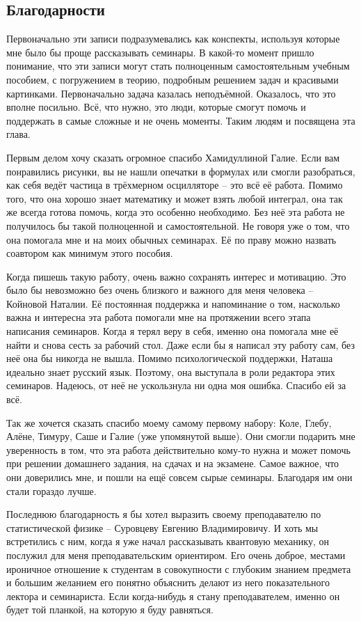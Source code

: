 \begin{center}
    \section{Благодарности}
\end{center}

Первоначально эти записи подразумевались как конспекты, используя которые мне было бы проще рассказывать семинары. В какой-то момент пришло понимание, что эти записи могут стать полноценным самостоятельным учебным пособием, с погружением в теорию, подробным решением задач и красивыми картинками. Первоначально задача казалась неподъёмной. Оказалось, что это вполне посильно. Всё, что нужно, это люди, которые смогут помочь и поддержать в самые сложные и не очень моменты. Таким людям и посвящена эта глава.

Первым делом хочу сказать огромное спасибо Хамидуллиной Галие. Если вам понравились рисунки, вы не нашли опечатки в формулах или смогли разобраться, как себя ведёт частица в трёхмерном осцилляторе -- это всё её работа. Помимо того, что она хорошо знает математику и может взять любой интеграл, она так же всегда готова помочь, когда это особенно необходимо. Без неё эта работа не получилось бы такой полноценной и самостоятельной. Не говоря уже о том, что она помогала мне и на моих обычных семинарах. Её по праву можно назвать соавтором как минимум этого пособия.

Когда пишешь такую работу, очень важно сохранять интерес и мотивацию. Это было бы невозможно без очень близкого и важного для меня человека -- Койновой Наталии. Её постоянная поддержка и напоминание о том, насколько важна и интересна эта работа помогали мне на протяжении всего этапа написания семинаров. Когда я терял веру в себя, именно она помогала мне её найти и снова сесть за рабочий стол. Даже если бы я написал эту работу сам, без неё она бы никогда не вышла. Помимо психологической поддержки, Наташа идеально знает русский язык. Поэтому, она выступала в роли редактора этих семинаров. Надеюсь, от неё не ускользнула ни одна моя ошибка. Спасибо ей за всё.

Так же хочется сказать спасибо моему самому первому набору: Коле, Глебу, Алёне, Тимуру, Саше и Галие (уже упомянутой выше). Они смогли подарить мне уверенность в том, что эта работа действительно кому-то нужна и может помочь при решении домашнего задания, на сдачах и на экзамене. Самое важное, что они доверились мне, и пошли на ещё совсем сырые семинары. Благодаря им они стали гораздо лучше.

Последнюю благодарность я бы хотел выразить своему преподавателю по статистической физике -- Суровцеву Евгению Владимировичу. И хоть мы встретились с ним, когда я уже начал рассказывать квантовую механику, он послужил для меня преподавательским ориентиром. Его очень доброе, местами ироничное отношение к студентам в совокупности с глубоким знанием предмета и большим желанием его понятно объяснить делают из него показательного лектора и семинариста. Если когда-нибудь я стану преподавателем, именно он будет той планкой, на которую я буду равняться. 